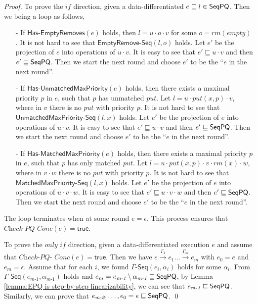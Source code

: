 \begin {proof}

To prove the $\textit{if}$ direction, given a data-differentiated $e \sqsubseteq l \in \mathsf{SeqPQ}$. Then we being a loop as follows,

\begin{itemize}
\setlength{\itemsep}{0.5pt}
\item[-] If $\mathsf{Has\text{-}EmptyRemoves}(e)$ holds, then $l = u \cdot o \cdot v$ for some $o=\textit{rm}(\textit{empty})$. It is not hard to see that $\mathsf{EmptyRemove\text{-}Seq}(l,o)$ holds. Let $e'$ be the projection of $e$ into operations of $u \cdot v$. It is easy to see that $e' \sqsubseteq u \cdot v$ and then $e' \sqsubseteq \mathsf{SeqPQ}$. Then we start the next round and choose $e'$ to be the ``$e$ in the next round''.

\item[-] If $\mathsf{Has\text{-}UnmatchedMaxPriority}(e)$ holds, then there exists a maximal priority $p$ in $e$, such that $p$ has unmatched $\textit{put}$. Let $l = u \cdot \textit{put}(x,p) \cdot v$, where in $v$ there is no $\textit{put}$ with priority $p$. It is not hard to see that $\mathsf{UnmatchedMaxPriority\text{-}Seq}(l,x)$ holds. Let $e'$ be the projection of $e$ into operations of $u \cdot v$. It is easy to see that $e' \sqsubseteq u \cdot v$ and then $e' \sqsubseteq \mathsf{SeqPQ}$. Then we start the next round and choose $e'$ to be the ``$e$ in the next round''.

\item[-] If $\mathsf{Has\text{-}MatchedMaxPriority}(e)$ holds, then there exists a maximal priority $p$ in $e$, such that $p$ has only matched $\textit{put}$. Let $l = u \cdot \textit{put}(x,p) \cdot v \cdot \textit{rm}(x) \cdot w$, where in $v \cdot w$ there is no $\textit{put}$ with priority $p$. It is not hard to see that $\mathsf{MatchedMaxPriority\text{-}Seq}(l,x)$ holds. Let $e'$ be the projection of $e$ into operations of $u \cdot v \cdot w$. It is easy to see that $e' \sqsubseteq u \cdot v \cdot w$ and then $e' \sqsubseteq \mathsf{SeqPQ}$. Then we start the next round and choose $e'$ to be the ``$e$ in the next round''. 
\end{itemize}

The loop terminates when at some round $e=\epsilon$. This process ensures that $\textit{Check-PQ-Conc}(e)=\mathsf{true}$. 

To prove the $\textit{only if}$ direction, given a data-differentiated execution $e$ and assume that $\textit{Check-PQ-}$ $\textit{Conc}(e)=\mathsf{true}$. Then we have $e \xrightarrow{\Gamma_1} e_1 \ldots \xrightarrow{\Gamma_m} e_m$ with $e_0=e$ and $e_m=\epsilon$. Assume that for each $i$, we found $\mathsf{\Gamma\text{-}Seq}(e_i,\alpha_i)$ holds for some $\alpha_i$. From $\mathsf{\Gamma\text{-}Seq}(e_{\textit{m-1}},\alpha_{\textit{m-1}})$ holds and $e_m = e_{\textit{m-1}} \setminus \alpha_{\textit{m-1}} \sqsubseteq \mathsf{SeqPQ}$, by Lemma \ref{lemma:EPQ is step-by-step linearizability}, we can see that $e_{\textit{m-1}} \sqsubseteq \mathsf{SeqPQ}$. Similarly, we can prove that $e_{\textit{m-2}},\ldots,e_0=e \sqsubseteq \mathsf{SeqPQ}$. \qed
\end {proof}





